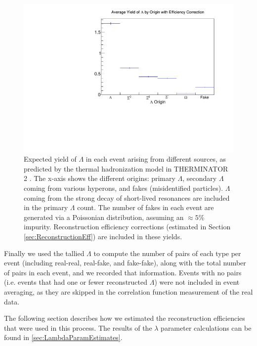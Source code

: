 \begin{figure}[hbtp]
\includegraphics[width=36pc]{Figures/YieldAndEff/2016-08-06-LambdaYieldsWithEfficiency.pdf}
\caption[$\Lambda$ yields from THERMINATOR 2 with efficiency corrections]{
Expected yield of $\Lambda$ in each event arising from different sources, as predicted by the thermal hadronization model in THERMINATOR 2 \cite{Chojnacki:2011hb}. The x-axis shows the different origins: primary $\Lambda$, secondary $\Lambda$ coming from various hyperons, and fakes (misidentified particles).  $\Lambda$ coming from the strong decay of short-lived resonances are included in the primary $\Lambda$ count. The number of fakes in each event are generated via a Poissonian distribution, assuming an $\approx 5$\% impurity. Reconstruction efficiency corrections (estimated in Section \ref{sec:ReconstructionEff}) are included in these yields.
}
\label{fig:LambdaYieldsWithEfficiency}
\end{figure}




Finally we used the tallied $\Lambda$ to compute the number of pairs of each type per event (including real-real, real-fake, and fake-fake), along with the total number of pairs in each event, and we recorded that information.
Events with no pairs (i.e. events that had one or fewer reconstructed $\Lambda$) were not included in event averaging, as they are skipped in the correlation function measurement of the real data.



The following section describes how we estimated the reconstruction efficiencies that were used in this process.
The results of the $\lambda$ parameter calculations can be found in \ref{sec:LambdaParamEstimates}.

